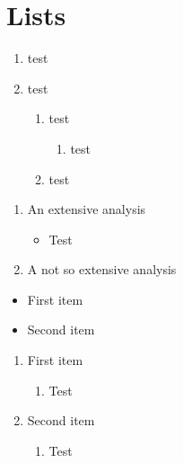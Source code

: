 \documentclass[10pt, a4paper]{article}
\begin{document}
\section{Lists}
\blindtext

\begin{enumerate}
  \item test
  \item test
  \begin{enumerate}
    \item test
    \begin{enumerate}
      \item test
    \end{enumerate}
    \item test
  \end{enumerate}
\end{enumerate}

\begin{enumerate}
  \item  An extensive analysis 
   \begin{itemize}
     \item Test
   \end{itemize}
 \item A not so extensive analysis
\end{enumerate}

\blindtext

\begin{itemize}
  \item First item
  \item[\ding{43}] Second item
\end{itemize}


\begin{enumerate}
  \item First item
  \begin{enumerate}
    \item Test
  \end{enumerate}
  \item Second item
  \begin{enumerate}
    \item Test
  \end{enumerate}
\end{enumerate}
\end{document}
